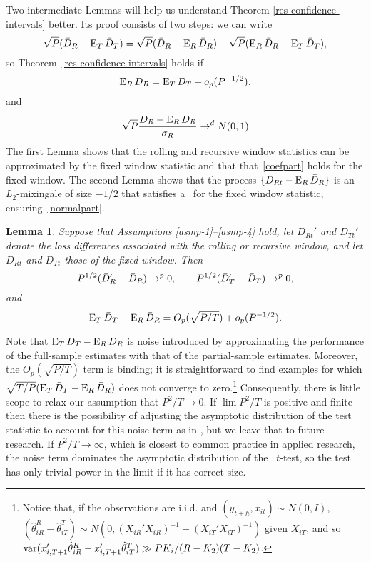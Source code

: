 \documentclass[11pt]{article}
\newtheorem{lem}{Lemma}
\begin{document}
Two intermediate Lemmas will help us understand Theorem
\ref{res-confidence-intervals} better.  Its proof consists of two
steps: we can write
\begin{equation}
  \sqrt{P} (\bar{D}_{R} - \operatorname{E}_T \bar{D}_{T}) = \sqrt{P} (\bar{D}_{R} - \operatorname{E}_R
  \bar{D}_{R}) + \sqrt{P} (\operatorname{E}_R \bar{D}_{R} - \operatorname{E}_T \bar{D}_{T}),
\end{equation}
so Theorem~\ref{res-confidence-intervals} holds if
\begin{equation}\label{coefpart}
  \operatorname{E}_R \bar{D}_{R} = \operatorname{E}_T \bar{D}_{T} + o_p(P^{-1/2}).
\end{equation}
and
\begin{equation}\label{normalpart}
  \sqrt{P}\frac{\bar{D}_{R} - \operatorname{E}_R \bar{D}_{R}}{\sigma_R} \to^d N(0,1)
\end{equation}
The first Lemma shows that the rolling and recursive window statistics
can be approximated by the fixed window statistic and that
that~\eqref{coefpart} holds for the fixed window.  The second Lemma
shows that the process $\{D_{Rt} - \operatorname{E}_R \bar{D}_{R}\}$ is an $L_2$-mixingale
of size $-1/2$ that satisfies a \clt\ for the fixed window statistic,
ensuring~\eqref{normalpart}.

\begin{lem} \label{res-convergence} Suppose that Assumptions
  \ref{asmp-1}--\ref{asmp-4} hold, let $D_{Rt}'$ and $D_{Tt}'$ denote
  the loss differences associated with the rolling or recursive
  window, and let $D_{Rt}$ and $D_{Tt}$ those of the fixed window.  Then
  \begin{equation}
    \label{eq:8}
    P^{1/2} (\bar{D}_{R}' - \bar{D}_{R}) \to^p 0, \qquad P^{1/2} (\bar{D}_{T}' - \bar{D}_{T})
    \to^p 0,
  \end{equation}
  and
  \begin{equation}\label{eq:7}
    \operatorname{E}_T \bar{D}_{T} - \operatorname{E}_R \bar{D}_{R} =  O_p(\sqrt{P/T}) +
    o_p(P^{-1/2}).
  \end{equation}
\end{lem}

Note that $\operatorname{E}_T \bar{D}_{T} - \operatorname{E}_R \bar{D}_{R}$ is noise introduced by
approximating the performance of the full-sample estimates with that
of the partial-sample estimates.  Moreover, the $O_p(\sqrt{P/T})$ term
is binding; it is straightforward to find examples for which
$\sqrt{T/P}(\operatorname{E}_T \bar{D}_{T} - \operatorname{E}_R \bar{D}_{R})$ does not converge to
zero.\footnote{Notice that, if the observations are i.i.d. and
  $(y_{t+h}, x_{it}) \sim N(0,I)$, $(\hat{\theta}_{iR}^R -
  \hat{\theta}_{iT}^T) \sim N(0, (X_{iR}'X_{iR})^{-1} -
  (X_{iT}'X_{iT})^{-1})$ given $X_{iT}$, and so
  $\operatorname{var}(x_{i,T+1}'\hat{\theta}_{iR}^R - x_{i,T+1}'
  \hat{\theta}_{iT}^T) \gg P K_i / (R - K_2)(T - K_2)$.}
Consequently, there is little scope to relax our assumption that
$P^2/T \to 0$.  If $\lim P^2/T$ is positive and finite then there is
the possibility of adjusting the asymptotic distribution of the test
statistic to account for this noise term as in \citet{Wes:96}, but we
leave that to future research.  If $P^2/T \to \infty$, which is
closest to common practice in applied research, the noise term
dominates the asymptotic distribution of the \oos\ $t$-test, so the
test has only trivial power in the limit if it has correct size.
\end{document}
